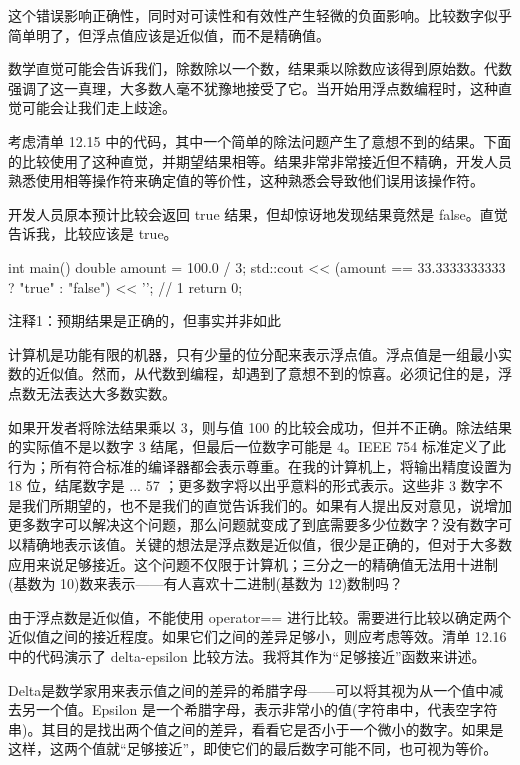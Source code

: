 这个错误影响正确性，同时对可读性和有效性产生轻微的负面影响。比较数字似乎简单明了，但浮点值应该是近似值，而不是精确值。


数学直觉可能会告诉我们，除数除以一个数，结果乘以除数应该得到原始数。代数强调了这一真理，大多数人毫不犹豫地接受了它。当开始用浮点数编程时，这种直觉可能会让我们走上歧途。

考虑清单 12.15 中的代码，其中一个简单的除法问题产生了意想不到的结果。下面的比较使用了这种直觉，并期望结果相等。结果非常非常接近但不精确，开发人员熟悉使用相等操作符来确定值的等价性，这种熟悉会导致他们误用该操作符。

开发人员原本预计比较会返回 true 结果，但却惊讶地发现结果竟然是 false。直觉告诉我，比较应该是 true。


\begin{cpp}
int main() {
  double amount = 100.0 / 3;
  std::cout << (amount == 33.3333333333 ? "true" : "false") << '\n'; // 1
  return 0;
}
\end{cpp}

{\footnotesize
注释1：预期结果是正确的，但事实并非如此
}


计算机是功能有限的机器，只有少量的位分配来表示浮点值。浮点值是一组最小实数的近似值。然而，从代数到编程，却遇到了意想不到的惊喜。必须记住的是，浮点数无法表达大多数实数。

如果开发者将除法结果乘以 3，则与值 100 的比较会成功，但并不正确。除法结果的实际值不是以数字 3 结尾，但最后一位数字可能是 4。IEEE 754 标准定义了此行为；所有符合标准的编译器都会表示尊重。在我的计算机上，将输出精度设置为 18 位，结尾数字是 ... 57 ；更多数字将以出乎意料的形式表示。这些非 3 数字不是我们所期望的，也不是我们的直觉告诉我们的。如果有人提出反对意见，说增加更多数字可以解决这个问题，那么问题就变成了到底需要多少位数字？没有数字可以精确地表示该值。关键的想法是浮点数是近似值，很少是正确的，但对于大多数应用来说足够接近。这个问题不仅限于计算机；三分之一的精确值无法用十进制(基数为 10)数来表示——有人喜欢十二进制(基数为 12)数制吗？


由于浮点数是近似值，不能使用 operator== 进行比较。需要进行比较以确定两个近似值之间的接近程度。如果它们之间的差异足够小，则应考虑等效。清单 12.16 中的代码演示了 delta-epsilon 比较方法。我将其作为“足够接近”函数来讲述。

Delta是数学家用来表示值之间的差异的希腊字母——可以将其视为从一个值中减去另一个值。Epsilon 是一个希腊字母，表示非常小的值(字符串中，代表空字符串)。其目的是找出两个值之间的差异，看看它是否小于一个微小的数字。如果是这样，这两个值就“足够接近”，即使它们的最后数字可能不同，也可视为等价。


